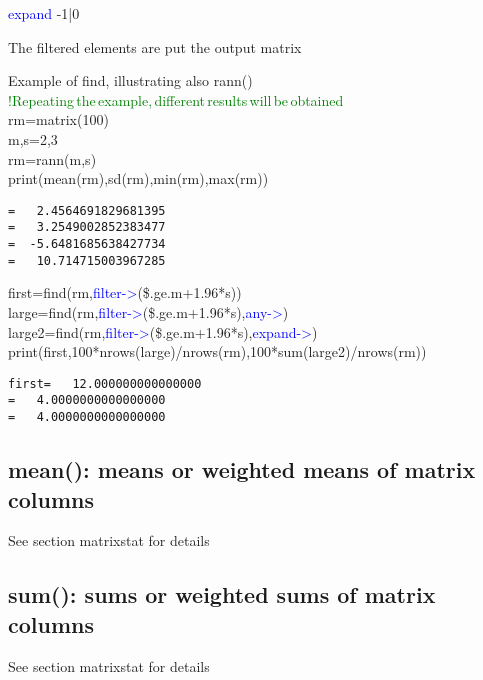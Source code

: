 \vspace{0.3cm}
\hline
\vspace{0.3cm}
\noindent \textcolor{blue}{expand} \tabto{3cm} -1|0 \tabto{5cm}   \tabto{7cm}
\begin{changemargin}{3cm}{0cm}
\noindent  The filtered elements are put the output matrix
\end {changemargin}
\hline
\vspace{0.2cm}
\begin{example}[findex]Example of find, illustrating also \textcolor{VioletRed}{rann}()\\
\label{findex}
\textcolor{green}{!Repeating\,the\,example,\,different\,results\,will\,be\,obtained}\\
rm=\textcolor{VioletRed}{matrix}(100)\\
m,s=2,3\\
rm=\textcolor{VioletRed}{rann}(m,s)\\
\textcolor{VioletRed}{print}(\textcolor{VioletRed}{mean}(rm),\textcolor{VioletRed}{sd}(rm),\textcolor{VioletRed}{min}(rm),\textcolor{VioletRed}{max}(rm))
\color{Green}
\begin{verbatim}
=   2.4564691829681395
=   3.2549002852383477
=  -5.6481685638427734
=   10.714715003967285
\end{verbatim}
\color{Black}
first=\textcolor{VioletRed}{find}(rm,\textcolor{blue}{filter->}(\$.ge.m+1.96*s))\\
large=\textcolor{VioletRed}{find}(rm,\textcolor{blue}{filter->}(\$.ge.m+1.96*s),\textcolor{blue}{any->})\\
large2=\textcolor{VioletRed}{find}(rm,\textcolor{blue}{filter->}(\$.ge.m+1.96*s),\textcolor{blue}{expand->})\\
\textcolor{VioletRed}{print}(first,100*nrows(large)/\textcolor{VioletRed}{nrows}(rm),100*sum(large2)/\textcolor{VioletRed}{nrows}(rm))
\color{Green}
\begin{verbatim}
first=   12.000000000000000
=   4.0000000000000000
=   4.0000000000000000
\end{verbatim}
\color{Black}
\end{example}
\subsection{\textcolor{VioletRed}{mean}(): means or weighted means of matrix columns}
\label{mean}
See section matrixstat for details
\subsection{\textcolor{VioletRed}{sum}(): sums or weighted sums of matrix columns}
\label{sum}
See section matrixstat for details
